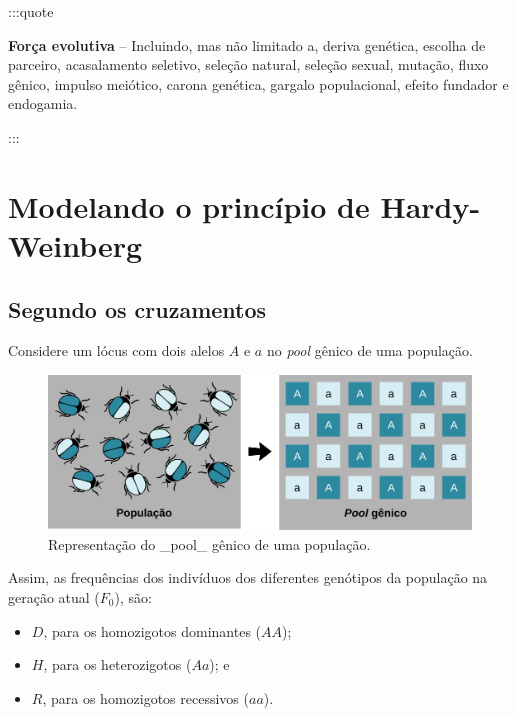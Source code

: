 \documentclass[
]{book}
\begin{document}
:::quote

\textbf{Força evolutiva} -- Incluindo, mas não limitado a, deriva genética, escolha de parceiro, acasalamento seletivo, seleção natural, seleção sexual, mutação, fluxo gênico, impulso meiótico, carona genética, gargalo populacional, efeito fundador e endogamia.

:::

\hypertarget{modelando-o-princuxedpio-de-hardy-weinberg}{%
\section{Modelando o princípio de Hardy-Weinberg}\label{modelando-o-princuxedpio-de-hardy-weinberg}}

\hypertarget{segundo-os-cruzamentos}{%
\subsection{Segundo os cruzamentos}\label{segundo-os-cruzamentos}}

Considere um lócus com dois alelos \(A\) e \(a\) no \emph{pool} gênico de uma população.

\begin{figure}

{\centering \includegraphics[width=600px]{figs/population_pool_gene} 

}

\caption{Representação do _pool_ gênico de uma população.}\label{fig:poppool}
\end{figure}

Assim, as frequências dos indivíduos dos diferentes genótipos da população na geração atual (\(F_0\)), são:

\begin{itemize}
\item
  \(D\), para os homozigotos dominantes (\(AA\));
\item
  \(H\), para os heterozigotos (\(Aa\)); e
\item
  \(R\), para os homozigotos recessivos (\(aa\)).
\end{itemize}
\end{document}
